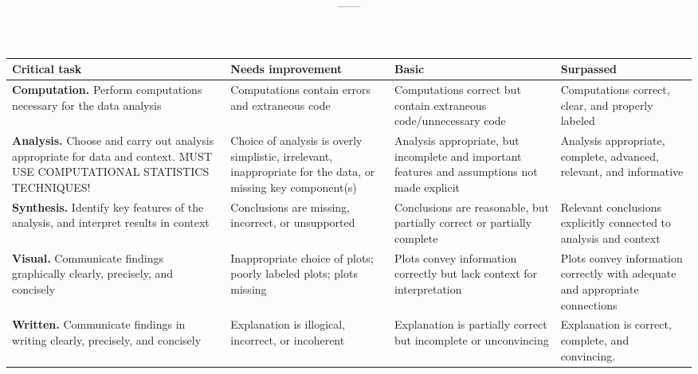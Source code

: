 \documentclass[11pt,onecolumn]{article}
\title{\textbf{\coursename}}
\author{{\semester}---{\roomnumb}---{\classtimes}}
\date{}
\makeatletter
\newcommand{\myname}{A.~Grant Schissler}
\newcommand{\myemail}{aschissler@unr.edu}
\newcommand{\office}{DMSC 224}
\newcommand{\officehours}{Tue 4pm-5pm, Wed 4pm-5pm, or by appointment}
\makeatother
\begin{document}
\maketitle

\vspace{-0.25in}
\noindent\makebox[\linewidth]{\rule{\textwidth}{1pt}}



\begin{table}[htb]
  \centering
  \begin{tabular}{|p{4.5cm}|p{3.5cm}|p{3.5cm}|p{3.5cm}|}
    \hline
    \bf Critical task & \bf Needs improvement & \bf Basic & \bf Surpassed \\
    \hline
    \hline
    \textbf{Computation.} Perform computations necessary for the data analysis & Computations contain errors and extraneous code & Computations correct but contain extraneous code/unnecessary code & Computations correct, clear, and properly labeled\\
    \hline
    \textbf{Analysis.} Choose and carry out analysis appropriate for data and context. MUST USE COMPUTATIONAL STATISTICS TECHNIQUES! & Choice of analysis is overly simplistic, irrelevant, inappropriate for the data, or missing key component(s)& Analysis appropriate, but incomplete and important features and assumptions not made explicit & Analysis appropriate, complete, advanced, relevant, and informative\\
    \hline
    \textbf{Synthesis.} Identify key features of the analysis, and interpret results in context & Conclusions are missing, incorrect, or unsupported & Conclusions are reasonable, but partially correct or partially complete & Relevant conclusions explicitly connected to analysis and context\\
    \hline
    \textbf{Visual.} Communicate findings graphically clearly, precisely, and concisely & Inappropriate choice of plots; poorly labeled plots; plots missing & Plots convey information correctly but lack context for interpretation & Plots convey information correctly with adequate and appropriate connections\\
    \hline
    \textbf{Written.} Communicate findings in writing clearly, precisely, and concisely & Explanation is illogical, incorrect, or incoherent & Explanation is partially correct but incomplete or unconvincing & Explanation is correct, complete, and convincing.\\
    \hline
  \end{tabular}
\end{table}
\end{document}
